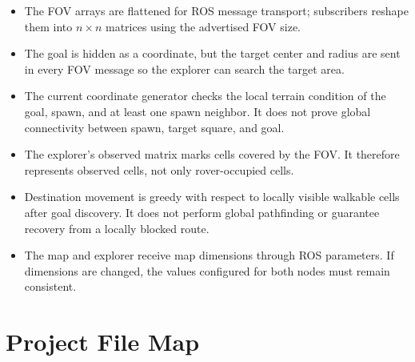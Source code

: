 \documentclass[11pt,a4paper]{article}
\begin{document}
\begin{itemize}
    \item The FOV arrays are flattened for ROS message transport; subscribers
    reshape them into \(n\times n\) matrices using the advertised FOV size.
    \item The goal is hidden as a coordinate, but the target center and radius
    are sent in every FOV message so the explorer can search the target area.
    \item The current coordinate generator checks the local terrain condition
    of the goal, spawn, and at least one spawn neighbor. It does not prove
    global connectivity between spawn, target square, and goal.
    \item The explorer's observed matrix marks cells covered by the FOV. It
    therefore represents observed cells, not only rover-occupied cells.
    \item Destination movement is greedy with respect to locally visible
    walkable cells after goal discovery. It does not perform global
    pathfinding or guarantee recovery from a locally blocked route.
    \item The map and explorer receive map dimensions through ROS parameters.
    If dimensions are changed, the values configured for both nodes must
    remain consistent.
\end{itemize}

\section{Project File Map}
\end{document}
